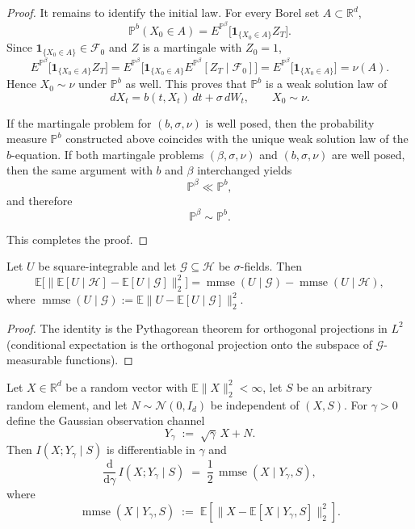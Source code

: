 \documentclass[twoside,11pt]{article}
\DeclareMathOperator{\mmse}{mmse}
\newcommand{\R}{\mathbb{R}}
\newcommand{\E}{\mathbb{E}}
\newcommand{\Nc}{\mathcal{N}}
\newcommand{\dd}{\mathrm{d}}
\numberwithin{equation}{section}
\begin{document}
\begin{proof}
It remains to identify the initial law. For every Borel set $A\subset\mathbb R^d$,
\[
\mathbb{P}^b(X_0\in A)
=
E^{\mathbb{P}^\beta}\big[\mathbf 1_{\{X_0\in A\}}Z_T\big].
\]
Since $\mathbf 1_{\{X_0\in A\}}\in\mathcal F_0$ and $Z$ is a martingale with $Z_0=1$,
\[
E^{\mathbb{P}^\beta}\big[\mathbf 1_{\{X_0\in A\}}Z_T\big]
=
E^{\mathbb{P}^\beta}\Big[\mathbf 1_{\{X_0\in A\}}E^{\mathbb{P}^\beta}[Z_T\mid \mathcal F_0]\Big]
=
E^{\mathbb{P}^\beta}\big[\mathbf 1_{\{X_0\in A\}}\big]
=
\nu(A).
\]
Hence $X_0\sim \nu$ under $\mathbb{P}^b$ as well. This proves that $\mathbb{P}^b$ is a weak solution law of
\[
dX_t=b(t,X_t)\,dt+\sigma\,dW_t,\qquad X_0\sim \nu.
\]

\medskip

If the martingale problem for $(b,\sigma,\nu)$ is well posed, then the probability measure $\mathbb{P}^b$ constructed above coincides with the unique weak solution law of the $b$-equation. If both martingale problems $(\beta,\sigma,\nu)$ and $(b,\sigma,\nu)$ are well posed, then the same argument with $b$ and $\beta$ interchanged yields
\[
\mathbb{P}^\beta\ll \mathbb{P}^b,
\]
and therefore
\[
\mathbb{P}^\beta\sim \mathbb{P}^b.
\]

This completes the proof.
\end{proof}




\begin{lemma}\label{lem:mmse_gap}
Let $U$ be square-integrable and let $\mathcal G \subseteq \mathcal H$ be
$\sigma$-fields. Then
\[
\E\bigl[\| \E[U\mid \mathcal H]-\E[U\mid \mathcal G]\|_2^2\bigr]
=\mmse(U\mid \mathcal G)-\mmse(U\mid \mathcal H),
\]
where $\mmse(U\mid \mathcal G):=\E\|U-\E[U\mid\mathcal G]\|_2^2$.

\end{lemma}

\begin{proof}
The identity is the Pythagorean theorem for orthogonal projections in
$L^2$ (conditional expectation is the orthogonal projection onto the subspace
of $\mathcal G$-measurable functions).

\end{proof}
\begin{lemma}\label{lem:conditional_immse}
Let $X\in\R^d$ be a random vector with $\E\|X\|_2^2<\infty$, let $S$ be an arbitrary
random element, and let $N\sim\Nc(0,I_d)$ be independent of $(X,S)$. For $\gamma>0$
define the Gaussian observation channel
\[
Y_\gamma \;:=\; \sqrt{\gamma}\,X + N .
\]
Then $I(X;Y_\gamma\mid S)$ is differentiable in $\gamma$ and
\[
\frac{\dd}{\dd\gamma}\,I(X;Y_\gamma\mid S)
\;=\;
\frac12\,\mmse(X\mid Y_\gamma,S),
\]
where
\[
\mmse(X\mid Y_\gamma,S)
\;:=\;
\E\!\left[\big\|X-\E[X\mid Y_\gamma,S]\big\|_2^2\right].
\]
\end{lemma}
\end{document}
